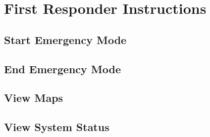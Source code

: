 

\setcounter{section}{0}
\section{First Responder Instructions}

\bigskip

\subsection{Start Emergency Mode}
\subsection{End Emergency Mode}
\subsection{View Maps}
\subsection{View System Status}